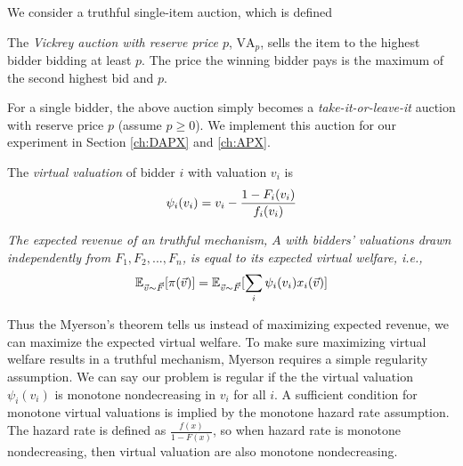We consider a truthful single-item auction, which is defined
\begin{definition}
The \textit{Vickrey auction with reserve price $p$}, $\text{VA}_p$, sells the item to the highest bidder bidding at least $p$. The price the winning bidder pays is the maximum of the second highest bid and $p$.
\label{def:VA}
\end{definition}
For a single bidder, the above auction simply becomes a \textit{take-it-or-leave-it} auction with reserve price $p$ (assume $p \geqslant 0$). We implement this auction for our experiment in Section \ref{ch:DAPX} and \ref{ch:APX}. 
\vspace{0.4cm}
\begin{definition}
\label{def: virtual_valuation} The \textit{virtual valuation} of bidder $i$ with valuation $v_i$ is 
\begin{equation}\notag 
    \psi_i(v_i) = v_i - \frac{1-F_i(v_i)}{f_i(v_i)}
\end{equation}
\end{definition}
\vspace{0.4cm}
\begin{theorem} \textit{The expected revenue of an truthful mechanism,} $A$ \textit{ with bidders' valuations drawn independently from $F_1, F_2,...,F_n$,} \textit{is equal to its expected virtual welfare, i.e.,}
\begin{equation}\notag 
    \mathbb{E}_{\vec{v} \sim \vec{F}}[\pi(\vec{v})] =  \mathbb{E}_{\vec{v}\sim \vec{F}}[\sum_i \psi_i(v_i)x_i(\vec{v})]
\end{equation}
 \label{thm: myerson} 
\end{theorem}
Thus the Myerson's theorem tells us instead of maximizing expected revenue, we can maximize the expected virtual welfare. To make sure maximizing virtual welfare results in a truthful mechanism, Myerson \cite{myerson1981optimal} requires a simple regularity assumption. We can say our problem is regular if the the virtual valuation $\psi_i(v_i)$ is monotone nondecreasing in $v_i$ for all $i$. A sufficient condition for monotone virtual valuations is implied by the monotone hazard rate assumption. The hazard rate is defined as $\frac{f(x)}{1-F(x)}$, so when hazard rate is monotone nondecreasing, then virtual valuation are also monotone nondecreasing.

